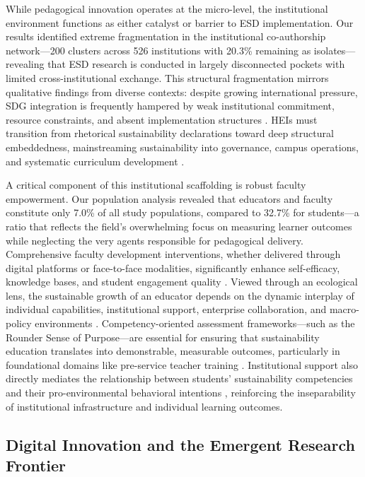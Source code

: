\documentclass[pdflatex,sn-basic]{sn-jnl}%
\begin{document}
While pedagogical innovation operates at the micro-level, the institutional environment functions as either catalyst or barrier to ESD implementation. Our results identified extreme fragmentation in the institutional co-authorship network---200 clusters across 526 institutions with 20.3\% remaining as isolates---revealing that ESD research is conducted in largely disconnected pockets with limited cross-institutional exchange. This structural fragmentation mirrors qualitative findings from diverse contexts: despite growing international pressure, SDG integration is frequently hampered by weak institutional commitment, resource constraints, and absent implementation structures \cite{dalelo_assessing_2026}. HEIs must transition from rhetorical sustainability declarations toward deep structural embeddedness, mainstreaming sustainability into governance, campus operations, and systematic curriculum development \cite{arnado_mapping_2023, de_campos_junges_learning_2026}.

A critical component of this institutional scaffolding is robust faculty empowerment. Our population analysis revealed that educators and faculty constitute only 7.0\% of all study populations, compared to 32.7\% for students---a ratio that reflects the field's overwhelming focus on measuring learner outcomes while neglecting the very agents responsible for pedagogical delivery. Comprehensive faculty development interventions, whether delivered through digital platforms or face-to-face modalities, significantly enhance self-efficacy, knowledge bases, and student engagement quality \cite{hemmer_esd_2024, ravdansuren_sustainable_2025}. Viewed through an ecological lens, the sustainable growth of an educator depends on the dynamic interplay of individual capabilities, institutional support, enterprise collaboration, and macro-policy environments \cite{wang_exploring_2025, bebenimibo_collaboration_2025}. Competency-oriented assessment frameworks---such as the Rounder Sense of Purpose---are essential for ensuring that sustainability education translates into demonstrable, measurable outcomes, particularly in foundational domains like pre-service teacher training \cite{balis_exploring_2026, valderrama-hernandez_instrument_2025}. Institutional support also directly mediates the relationship between students' sustainability competencies and their pro-environmental behavioral intentions \cite{arnejo_modeling_2025}, reinforcing the inseparability of institutional infrastructure and individual learning outcomes.

\subsection{Digital Innovation and the Emergent Research Frontier}
\end{document}
